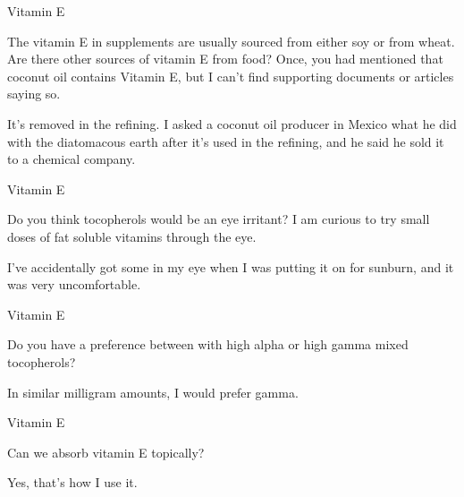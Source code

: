 \documentclass[11pt,oneside,openany,extrafontsizes]{memoir}
\begin{document}
\begin{emailexchange}{Vitamin E}

    \begin{question}
        The vitamin E in supplements are usually sourced from either soy or from wheat. Are there other sources of vitamin E from food? Once, you had mentioned that coconut oil contains Vitamin E, but I can't find supporting documents or articles saying so.
    \end{question}

    \begin{answer}
        It's removed in the refining. I asked a coconut oil producer in Mexico what he did with the diatomacous earth after it's used in the refining, and he said he sold it to a chemical company.
    \end{answer}
\end{emailexchange}

\begin{qaexchange}{Vitamin E}

    \begin{question}
        Do you think tocopherols would be an eye irritant? I am curious to try small doses of fat soluble vitamins through the eye.
    \end{question}

    \begin{answer}
        I've accidentally got some in my eye when I was putting it on for sunburn, and it was very uncomfortable.
    \end{answer}
\end{qaexchange}

\begin{qaexchange}{Vitamin E}

    \begin{question}
        Do you have a preference between with high alpha or high gamma mixed tocopherols?
    \end{question}

    \begin{answer}
        In similar milligram amounts, I would prefer gamma.
    \end{answer}
\end{qaexchange}

\begin{qaexchange}{Vitamin E}

    \begin{question}
        Can we absorb vitamin E topically?
    \end{question}

    \begin{answer}
      Yes, that's how I use it.
    \end{answer}
\end{qaexchange}
\end{document}
